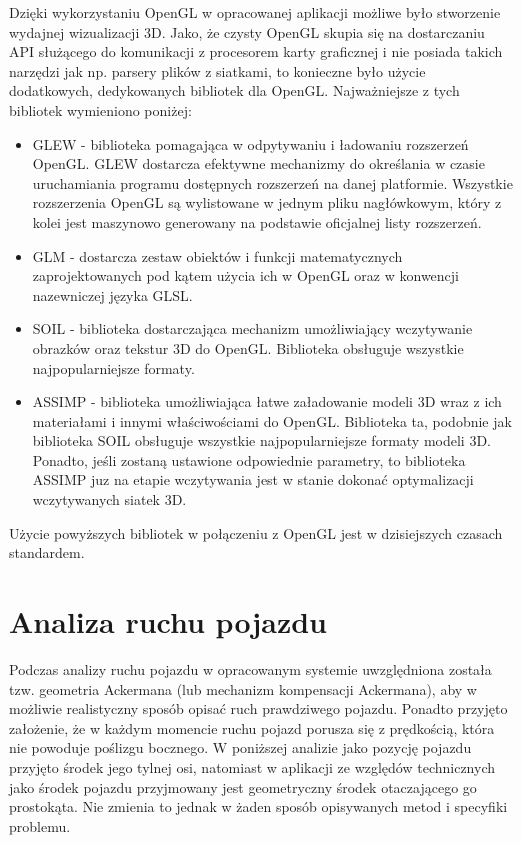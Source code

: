 \documentclass[a4paper,11pt,twoside]{report}
\theoremstyle{definition}
\begin{document}
Dzięki wykorzystaniu OpenGL w opracowanej aplikacji możliwe było stworzenie wydajnej wizualizacji 3D. Jako, że czysty OpenGL skupia się na dostarczaniu API służącego do komunikacji z procesorem karty graficznej i nie posiada takich narzędzi jak np. parsery plików z siatkami, to konieczne było użycie dodatkowych, dedykowanych bibliotek dla OpenGL. Najważniejsze z tych bibliotek wymieniono poniżej:
\begin{itemize}
	\item GLEW - biblioteka pomagająca w odpytywaniu i ładowaniu rozszerzeń OpenGL. GLEW dostarcza efektywne mechanizmy do określania w czasie uruchamiania programu dostępnych rozszerzeń na danej platformie. Wszystkie rozszerzenia OpenGL są wylistowane w jednym pliku nagłówkowym, który z kolei jest maszynowo generowany na podstawie oficjalnej listy rozszerzeń.
	\item GLM - dostarcza zestaw obiektów i funkcji matematycznych zaprojektowanych pod kątem użycia ich w OpenGL oraz w konwencji nazewniczej języka GLSL.
	\item SOIL - biblioteka dostarczająca mechanizm umożliwiający wczytywanie obrazków oraz tekstur 3D do OpenGL. Biblioteka obsługuje wszystkie najpopularniejsze formaty.
	\item ASSIMP - biblioteka umożliwiająca łatwe załadowanie modeli 3D wraz z ich materiałami i innymi właściwościami do OpenGL. Biblioteka ta, podobnie jak biblioteka SOIL obsługuje wszystkie najpopularniejsze formaty modeli 3D. Ponadto, jeśli zostaną ustawione odpowiednie parametry, to biblioteka ASSIMP juz na etapie wczytywania jest w stanie dokonać optymalizacji wczytywanych siatek 3D.
\end{itemize}

Użycie powyższych bibliotek w połączeniu z OpenGL jest w dzisiejszych czasach standardem.

\chapter{Analiza ruchu pojazdu}

Podczas analizy ruchu pojazdu w opracowanym systemie uwzględniona została tzw. geometria Ackermana (lub mechanizm kompensacji Ackermana), aby w możliwie realistyczny sposób opisać ruch prawdziwego pojazdu. Ponadto przyjęto założenie, że w każdym momencie ruchu pojazd porusza się z prędkością, która nie powoduje poślizgu bocznego. W poniższej analizie jako pozycję pojazdu przyjęto środek jego tylnej osi, natomiast w aplikacji ze względów technicznych jako środek pojazdu przyjmowany jest geometryczny środek otaczającego go prostokąta. Nie zmienia to jednak w żaden sposób opisywanych metod i specyfiki problemu.
\end{document}
